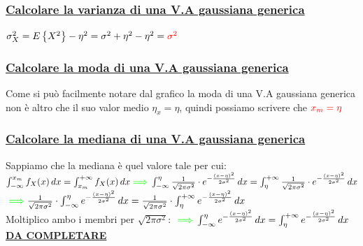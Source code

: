 \documentclass{article}
\begin{document}
\subsubsection{\underline{Calcolare la varianza di una V.A gaussiana generica}}
$\sigma_X^2 = E \left\{ X^2 \right\} - \eta^2 = \sigma^2 + \eta^2 -\eta^2 = \color{red} \sigma^2$
\subsubsection{\underline{Calcolare la moda di una V.A gaussiana generica}}
Come si può facilmente notare dal grafico la moda di una V.A gaussiana generica non è altro che il suo valor medio $\eta_x = \eta$, quindi possiamo scrivere che $\color{red}x_m = \eta$
\subsubsection{\underline{Calcolare la mediana di una V.A gaussiana generica}}
Sappiamo che la mediana è quel valore tale per cui: \\
$\int_{-\infty}^{x_m} f_X(x) \,dx = \int_{x_m}^{+\infty} f_X(x) \,dx
{\color{green}\implies}\int_{-\infty}^{\eta} \frac{1}{\sqrt{2 \pi \sigma^2}} \cdot e^{-\frac{\left( x - \eta \right)^2}{2\sigma^2}}  \,dx = \int_{\eta}^{+\infty} \frac{1}{\sqrt{2 \pi \sigma^2}} \cdot e^{-\frac{\left( x - \eta \right)^2}{2\sigma^2}}  \,dx$ \\
${\color{green}\implies} \frac{1}{\sqrt{2 \pi \sigma^2}} \cdot \int_{-\infty}^{\eta}  e^{-\frac{\left( x - \eta \right)^2}{2\sigma^2}}  \,dx = \frac{1}{\sqrt{2 \pi \sigma^2}} \cdot \int_{\eta}^{+\infty} e^{-\frac{\left( x - \eta \right)^2}{2\sigma^2}}  \,dx$ \\
Moltiplico ambo i membri per $\sqrt{2 \pi \sigma^2}$: ${\color{green}\implies}
\int_{-\infty}^{\eta}  e^{-\frac{\left( x - \eta \right)^2}{2\sigma^2}}  \,dx = \int_{\eta}^{+\infty} e^{-\frac{\left( x - \eta \right)^2}{2\sigma^2}}  \,dx$ \\
\textbf{\underline{DA COMPLETARE}}
\end{document}
